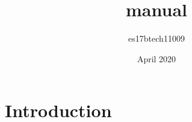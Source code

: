 \documentclass{article}
\title{manual}
\author{es17btech11009 }
\date{April 2020}
\begin{document}
\maketitle

\section{Introduction}
\end{document}
